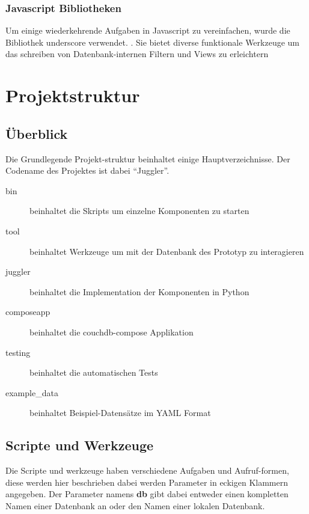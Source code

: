 \subsubsection{Javascript Bibliotheken}

Um einige wiederkehrende Aufgaben in Javascript zu vereinfachen,
wurde die Bibliothek underscore verwendet. \cite{javascript:underscore}.
Sie bietet diverse funktionale Werkzeuge um das schreiben
von Datenbank-internen Filtern und Views zu erleichtern


\section{Projektstruktur}
\subsection{Überblick}

Die Grundlegende Projekt-struktur beinhaltet einige Hauptverzeichnisse.
Der Codename des Projektes ist dabei ``Juggler''.


\begin{description}
    \item[bin] beinhaltet die Skripts um einzelne Komponenten zu starten
    \item[tool] beinhaltet Werkzeuge um mit der Datenbank des Prototyp zu interagieren
    \item[juggler] beinhaltet die Implementation der Komponenten in Python
    \item[composeapp] beinhaltet die couchdb-compose Applikation
    \item[testing] beinhaltet die automatischen Tests
    \item[example\_data] beinhaltet Beispiel-Datensätze im YAML Format
\end{description}

\subsection{Scripte und Werkzeuge}
Die Scripte und werkzeuge haben verschiedene Aufgaben und Aufruf-formen,
diese werden hier beschrieben dabei werden Parameter in eckigen Klammern angegeben.
Der Parameter namens \textbf{db} gibt dabei entweder einen kompletten Namen einer  Datenbank an oder den Namen einer lokalen Datenbank.

